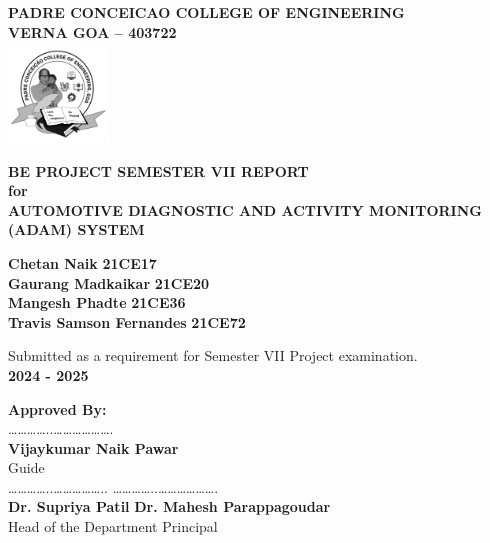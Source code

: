 \newpage
\thispagestyle{empty} %
\centering
{\large \textbf{PADRE CONCEICAO COLLEGE OF ENGINEERING}}\\[0.3cm]
{\large \textbf{VERNA GOA -- 403722}}\\[0.1cm]
\includegraphics[width=0.2\textwidth]{assets/logo.png}

{\large \textbf{BE PROJECT SEMESTER VII REPORT}}\\[0.3cm]
{\large \textbf{for}}\\[0.3cm]
{\large \textbf{AUTOMOTIVE DIAGNOSTIC AND ACTIVITY MONITORING (ADAM) SYSTEM}}\\[0.5cm]

\begin{center}
    \normalsize
        {\textbf{Chetan Naik}} \hspace{3.2cm} {\textbf{21CE17}}\\[0.1cm]
        {\textbf{Gaurang Madkaikar}} \hspace{1.8cm} {\textbf{21CE20}}\\[0.1cm]
        {\textbf{Mangesh Phadte}} \hspace{2.5cm} {\textbf{21CE36}}\\[0.1cm]
        {\textbf{Travis Samson Fernandes}} \hspace{0.7cm} {\textbf{21CE72}}
\end{center}

{\large {Submitted as a requirement for Semester VII Project examination.}}\\[0.5cm]
{\large \textbf{2024 - 2025}}\\[0.2cm]

\raggedright
\textbf{Approved By:}\\[0.8cm]
\hspace{1cm} …………..……………….\\           
\hspace{1cm} \textbf{Vijaykumar Naik Pawar}\\
\hspace{1cm} \hspace{1cm} Guide\\[0.8cm]

\hspace{1cm} …………..…………….. \hspace{1cm} …………..……………….\\
\hspace{1cm} \textbf{Dr. Supriya Patil} \hspace{3.5cm} \textbf{Dr. Mahesh Parappagoudar}\\
\hspace{1cm} Head of the Department \hspace{4cm} Principal\\[0.5cm]

